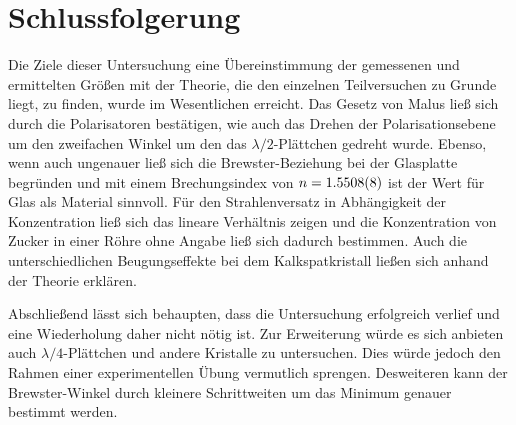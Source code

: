 \section{Schlussfolgerung}

	Die Ziele dieser Untersuchung eine Übereinstimmung der gemessenen und ermittelten Größen mit der Theorie, die den einzelnen Teilversuchen zu Grunde liegt, zu finden, wurde im Wesentlichen erreicht.
	Das Gesetz von Malus ließ sich durch die Polarisatoren bestätigen, wie auch das Drehen der Polarisationsebene um den zweifachen Winkel um den das $\lambda/2$-Plättchen gedreht wurde.
	Ebenso, wenn auch ungenauer ließ sich die Brewster-Beziehung bei der Glasplatte begründen und mit einem Brechungsindex von $n = \SI{1,5508+-0,0008}{}$ ist der Wert für Glas als Material sinnvoll.
	Für den Strahlenversatz in Abhängigkeit der Konzentration ließ sich das lineare Verhältnis zeigen und die Konzentration von Zucker in einer Röhre ohne Angabe ließ sich dadurch bestimmen.
	Auch die unterschiedlichen Beugungseffekte bei dem Kalkspatkristall ließen sich anhand der Theorie erklären. 
	
	Abschließend lässt sich behaupten, dass die Untersuchung erfolgreich verlief und eine Wiederholung daher nicht nötig ist.
	Zur Erweiterung würde es sich anbieten auch $\lambda/4$-Plättchen und andere Kristalle zu untersuchen. 
	Dies würde jedoch den Rahmen einer experimentellen Übung vermutlich sprengen.
	Desweiteren kann der Brewster-Winkel durch kleinere Schrittweiten um das Minimum genauer bestimmt werden.
	